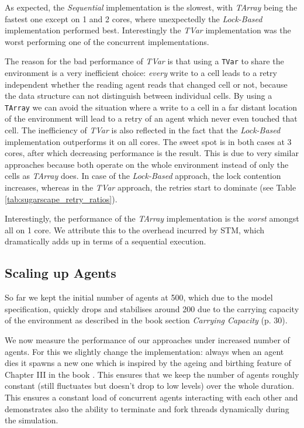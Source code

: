 As expected, the \textit{Sequential} implementation is the slowest, with \textit{TArray} being the fastest one except on 1 and 2 cores, where unexpectedly the \textit{Lock-Based} implementation performed best. Interestingly the \textit{TVar} implementation was the worst performing one of the concurrent implementations.

The reason for the bad performance of \textit{TVar} is that using a \texttt{TVar} to share the environment is a very inefficient choice: \textit{every} write to a cell leads to a retry independent whether the reading agent reads that changed cell or not, because the data structure can not distinguish between individual cells. By using a \texttt{TArray} we can avoid the situation where a write to a cell in a far distant location of the environment will lead to a retry of an agent which never even touched that cell. The inefficiency of \textit{TVar} is also reflected in the fact that the \textit{Lock-Based} implementation outperforms it on all cores. The sweet spot is in both cases at 3 cores, after which decreasing performance is the result. This is due to very similar approaches because both operate on the whole environment instead of only the cells as \textit{TArray} does. In case of the \textit{Lock-Based} approach, the lock contention increases, whereas in the \textit{TVar} approach, the retries start to dominate (see Table \ref{tab:sugarscape_retry_ratios}).

Interestingly, the performance of the \textit{TArray} implementation is the \textit{worst} amongst all on 1 core. We attribute this to the overhead incurred by STM, which dramatically adds up in terms of a sequential execution.

\subsection{Scaling up Agents}
So far we kept the initial number of agents at 500, which due to the model specification, quickly drops and stabilises around 200 due to the carrying capacity of the environment as described in the book \cite{epstein_growing_1996} section \textit{Carrying Capacity} (p. 30).

We now measure the performance of our approaches under increased number of agents. For this we slightly change the implementation: always when an agent dies it spawns a new one which is inspired by the ageing and birthing feature of Chapter III in the book \cite{epstein_growing_1996}. This ensures that we keep the number of agents roughly constant (still fluctuates but doesn't drop to low levels) over the whole duration. This ensures a constant load of concurrent agents interacting with each other and demonstrates also the ability to terminate and fork threads dynamically during the simulation.

